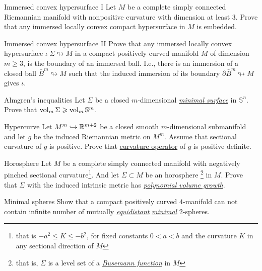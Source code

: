 \documentclass[twoside]{book}
\begin{document}
\begin{pr}{}{Immersed convex hypersurface {\rm I}}\label{Immersed convex hypersurface I} Let $M$ be a complete simply connected Riemannian manifold with nonpositive curvature with dimension at least $3$.
Prove that any  immersed locally convex
compact hypersurface in $M$ is embedded.
\end{pr}

\begin{pr}{\hard}{Immersed convex hypersurface {\rm II}}\label{Immersed convex hypersurface II}
Prove that any immersed locally convex
hypersurface $\iota\:\Sigma\looparrowright M$
in a compact positively curved manifold $M$ of dimension $m\ge 3$, is the boundary of an immersed ball. 
I.e., there is an immersion of a closed ball $\bar B^m\looparrowright M$ such that the induced immersion of its boundary $\partial \bar B^m\looparrowright M$ gives $\iota$.
\end{pr}

\begin{pr}{}{Almgren's inequalities}\label{almgren} 
Let $\Sigma$ be a closed $m$-dimensional 
\hyperref[Minimal surface]{\emph{minimal surface}} 
in $\mathbb{S}^n$.
Prove that
$\operatorname{\rm vol}_m \Sigma\geqslant \operatorname{\rm vol}_m \mathbb{S}^m$.
\end{pr}


\begin{pr}{}{Hypercurve}\label{codim=2}
Let $M^m\hookrightarrow \mathbb{R}^{m+2}$ be a closed smooth $m$-dimensional
submanifold and let  $g$ be the  induced Riemannian metric on $M^m$.
Assume that sectional curvature of $g$ is positive.
Prove that \hyperref[Curvature operator]{curvature operator} of $g$ is positive definite.
\end{pr}

\begin{pr}{}{Horosphere}\label{Horosphere} Let $M$ be a complete simply connected manifold with negatively pin\-ched sectional curvature\footnote{that is $-a^2\le K\le -b^2$, for fixed constants $0<a<b$ and the curvature $K$ in any sectional  direction of $M$}. 
And let $\Sigma\subset M$ be an horosphere%
\footnote{that is, $\Sigma$ is a level set of a 
\hyperref[Busemann function]{\emph{Busemann function}}
in $M$} in $M$.
 Prove that
$\Sigma$ with the  induced intrinsic metric has \hyperref[Polynomial volume growth]{\emph{polynomial volume growth}}.
\end{pr}

\begin{pr}{}{Minimal spheres}\label{Minimal spheres}
Show that a compact positively curved $4$-manifold can not contain infinite number of  mutually
 \hyperref[Equidistant subsets]{\emph{equidistant}} \hyperref[Minimal surface]{\emph{minimal}} 2-spheres.
\end{pr}
\end{document}
